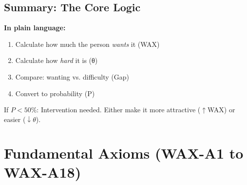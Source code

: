 \subsection{Summary: The Core Logic}

\begin{center}
\end{center}

\begin{intuition}
\textbf{In plain language:}
\begin{enumerate}
\item Calculate how much the person \textit{wants} it (WAX)
\item Calculate how \textit{hard} it is (θ)
\item Compare: wanting vs. difficulty (Gap)
\item Convert to probability (P)
\end{enumerate}

If $P < 50\%$: Intervention needed. Either make it more attractive ($\uparrow$WAX) or easier ($\downarrow\theta$).
\end{intuition}



\section{Fundamental Axioms (WAX-A1 to WAX-A18)}
\label{sec:av-fundamental}




